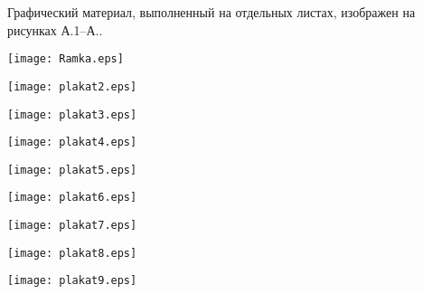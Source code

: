 
Графический материал, выполненный на отдельных листах,
изображен на рисунках А.1--А..
\setcounter{числоПлакатов}{0}

\renewcommand{\thefigure}{А.\arabic{figure}} %

\begin{landscape}

\begin{плакат}
    \texttt{[image: Ramka.eps]}
    \label{pl1:image}      
\end{плакат}

\begin{плакат}
    \texttt{[image: plakat2.eps]}
    \label{pl2:image}      
\end{плакат}

\begin{плакат}
	\texttt{[image: plakat3.eps]}
	\label{pl3:image}      
\end{плакат}

\begin{плакат}
	\texttt{[image: plakat4.eps]}
	\label{pl4:image}      
\end{плакат}

\begin{плакат}
	\texttt{[image: plakat5.eps]}
	\label{pl5:image}      
\end{плакат}

\begin{плакат}
	\texttt{[image: plakat6.eps]}
	\label{pl6:image}      
\end{плакат}

\begin{плакат}
	\texttt{[image: plakat7.eps]}
	\label{pl7:image}      
\end{плакат}

\begin{плакат}
	\texttt{[image: plakat8.eps]}
	\label{pl8:image}      
\end{плакат}

\begin{плакат}
	\texttt{[image: plakat9.eps]}
	\label{pl9:image}      
\end{плакат}


\end{landscape}
